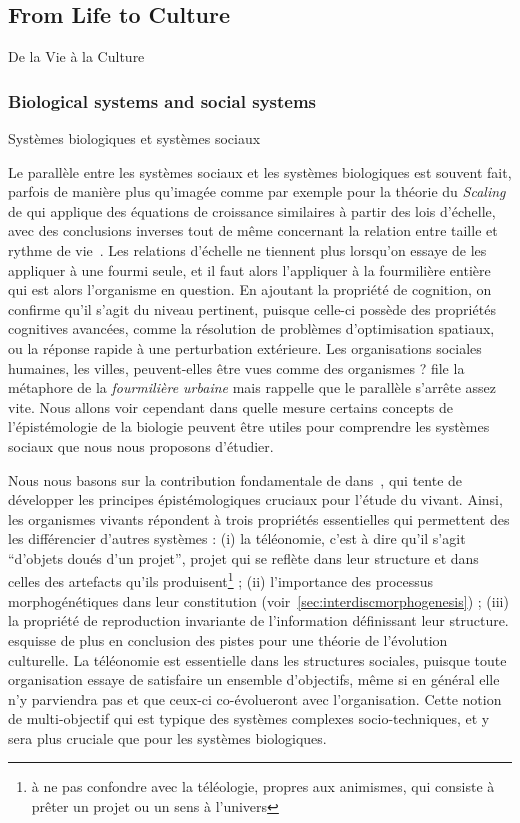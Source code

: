 \subsection{From Life to Culture}{De la Vie à la Culture}

\subsubsection{Biological systems and social systems}{Systèmes biologiques et systèmes sociaux}

Le parallèle entre les systèmes sociaux et les systèmes biologiques est souvent fait, parfois de manière plus qu'imagée comme par exemple pour la théorie du \emph{Scaling} de  qui applique des équations de croissance similaires à partir des lois d'échelle, avec des conclusions inverses tout de même concernant la relation entre taille et rythme de vie~\cite{bettencourt2007growth}. Les relations d'échelle ne tiennent plus lorsqu'on essaye de les appliquer à une fourmi seule, et il faut alors l'appliquer à la fourmilière entière qui est alors l'organisme en question. En ajoutant la propriété de cognition, on confirme qu'il s'agit du niveau pertinent, puisque celle-ci possède des propriétés cognitives avancées, comme la résolution de problèmes d'optimisation spatiaux, ou la réponse rapide à une perturbation extérieure. Les organisations sociales humaines, les villes, peuvent-elles être vues comme des organismes ? \cite{banos2013pour} file la métaphore de la \emph{fourmilière urbaine} mais rappelle que le parallèle s'arrête assez vite. Nous allons voir cependant dans quelle mesure certains concepts de l'épistémologie de la biologie peuvent être utiles pour comprendre les systèmes sociaux que nous nous proposons d'étudier.


Nous nous basons sur la contribution fondamentale de  dans~\cite{monod1970hasard}, qui tente de développer les principes épistémologiques cruciaux pour l'étude du vivant. Ainsi, les organismes vivants répondent à trois propriétés essentielles qui permettent des les différencier d'autres systèmes : (i) la téléonomie, c'est à dire qu'il s'agit ``d'objets doués d'un projet'', projet qui se reflète dans leur structure et dans celles des artefacts qu'ils produisent\footnote{à ne pas confondre avec la téléologie, propres aux animismes, qui consiste à prêter un projet ou un sens à l'univers} ; (ii) l'importance des processus morphogénétiques dans leur constitution (voir~\ref{sec:interdiscmorphogenesis}) ; (iii) la propriété de reproduction invariante de l'information définissant leur structure.  esquisse de plus en conclusion des pistes pour une théorie de l'évolution culturelle. La téléonomie est essentielle dans les structures sociales, puisque toute organisation essaye de satisfaire un ensemble d'objectifs, même si en général elle n'y parviendra pas et que ceux-ci co-évolueront avec l'organisation. Cette notion de multi-objectif qui est typique des systèmes complexes socio-techniques, et y sera plus cruciale que pour les systèmes biologiques.

